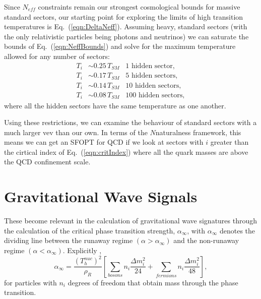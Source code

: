 \documentclass[nofootinbib,twocolumn,preprintnumbers]{revtex4-1}
\begin{document}
Since $N_{eff}$ constraints remain our strongest cosmological bounds for massive standard sectors, our starting point for exploring the limits of high transition temperatures is Eq.~(\ref{eqn:DeltaNeff}). Assuming heavy, standard sectors (with the only relativistic particles being photons and neutrinos) we can saturate the bounds of Eq.~(\ref{eqn:NeffBounds}) and solve for the maximum temperature allowed for any number of sectors:
\begin{equation}\label{eqn:energyDensityAllowed}
\begin{split}
T_i &\sim 0.25 \,T_{SM} \,\,\,\,\, \mathrm{1}\,\, \mathrm{hidden}\,\, \mathrm{sector},
\\
T_i &\sim 0.17 \,T_{SM} \,\,\,\,\, \mathrm{5} \,\,\mathrm{hidden}\,\, \mathrm{sectors},
\\
T_i &\sim 0.14 \,T_{SM} \,\,\,\,\, \mathrm{10} \,\,\mathrm{hidden}\,\, \mathrm{sectors},
\\
T_i &\sim 0.08 \,T_{SM} \,\,\,\,\, \mathrm{100} \,\,\mathrm{hidden}\,\, \mathrm{sectors},
\end{split}
\end{equation}
where all the hidden sectors have the same temperature as one another.

Using these restrictions, we can examine the behaviour of standard sectors with a much larger vev than our own. In terms of the $N$naturalness framework, this means we can get an SFOPT for QCD if we look at sectors with $i$ greater than the cirtical index of Eq.~(\ref{eqn:critIndex}) where all the quark masses are above the QCD confinement scale. 

\section{Gravitational Wave Signals}


These become relevant in the calculation of gravitational wave signatures through the calculation of the critical phase transition strength, $\alpha_{\infty}$, with $\alpha_{\infty}$ denotes the dividing line between the runaway regime  $(\alpha >\alpha_{\infty})$ and the non-runaway regime $(\alpha <\alpha_{\infty})$. Explicitly \cite{Breitbach:2018ddu, Caprini:2015zlo, Espinosa:2010hh}, 
\begin{equation}\label{eqn:critPTstrength}
\alpha_{\infty} = \frac{(T^{nuc}_h)^2}{\rho_R}\left[\sum_{bosons} n_i\frac{\Delta m^2_i}{24} + \sum_{fermions} n_i\frac{\Delta m_i^2}{48}\right],
\end{equation} 
for particles with $n_i$ degrees of freedom that obtain mass through the phase transition. 
\end{document}
